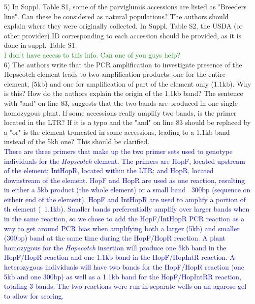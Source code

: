 \documentclass[11pt]{article}
\newcommand{\res}[1]{\noindent \textcolor{blue}{{#1}} \\}
\newcommand{\lev}[1]{\noindent \textcolor{green}{{#1}} \\}
\begin{document}
5) In Suppl. Table S1, some of the parviglumis accessions are listed as "Breeders line". Can these be considered as natural populations? The authors should explain where they were originally collected. In Suppl. Table S2, the USDA (or other provider) ID corresponding to each accession should be provided, as it is done in suppl. Table S1.\\

\lev{I don't have access to this info. Can one of you guys help?}

6) The authors write that the PCR amplification to investigate presence of the Hopscotch element leads to two amplification products: one for the entire element, (5kb) and one for amplification of part of the element only (1.1kb). Why is this? How do the authors explain the origin of the 1.1kb band? The sentence with "and" on line 83, suggests that the two bands are produced in one single homozygous plant. If some accessions really amplify two bands, is the primer located in the LTR? If it is a typo and the "and" on line 83 should be replaced by a "or" is the element truncated in some accessions, leading to a 1.1kb band instead of the 5kb one? This should be clarified.\\

\res{There are three primers that make up the two primer sets used to genotype individuals for the \emph{Hopscotch} element. The primers are HopF, located upstream of the element; IntHopR, located within the LTR; and HopR, located downstream of the element. HopF and HopR are used as one reaction, resulting in either a 5kb product (the whole element) or a small band ~300bp (sequence on eitheir end of the element). HopF and IntHopR are used to amplify a portion of th element (~1.1kb). Smaller bands preferentially amplify over larger bands when in the same reaction, so we chose to add the HopF/IntHopR PCR reaction as a way to get around PCR bias when amplifying both a larger (5kb) and smaller (300bp) band at the same time during the HopF/HopR reaction. A plant homozygous for the \emph{Hopscotch} insertion will produce one 5kb band in the HopF/HopR reaction and one 1.1kb band in the HopF/HopIntR reaction. A heterozygous individuals will have two bands for the HopF/HopR reaction (one 5kb and one 300bp) as well as a 1.1kb band for the HopF/HopIntRR reaction, totaling 3 bands. The two reactions were run in separate wells on an agarose gel to allow for scoring.}
\end{document}
